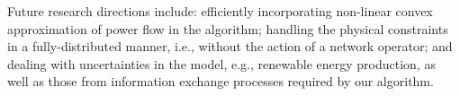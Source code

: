 \documentclass{IEEEtran}  %
\newcommand{\0}{\mathbf{0}}
\newcommand{\1}{\mathbf{1}}
\begin{document}
Future research directions include: efficiently incorporating non-linear convex approximation of power flow in the algorithm; handling the physical constraints in a fully-distributed manner, i.e., without the action of a network operator; and dealing with uncertainties in the model, e.g., renewable energy production, as well as those from information exchange processes required by our algorithm.

\balance



%
\end{document}
